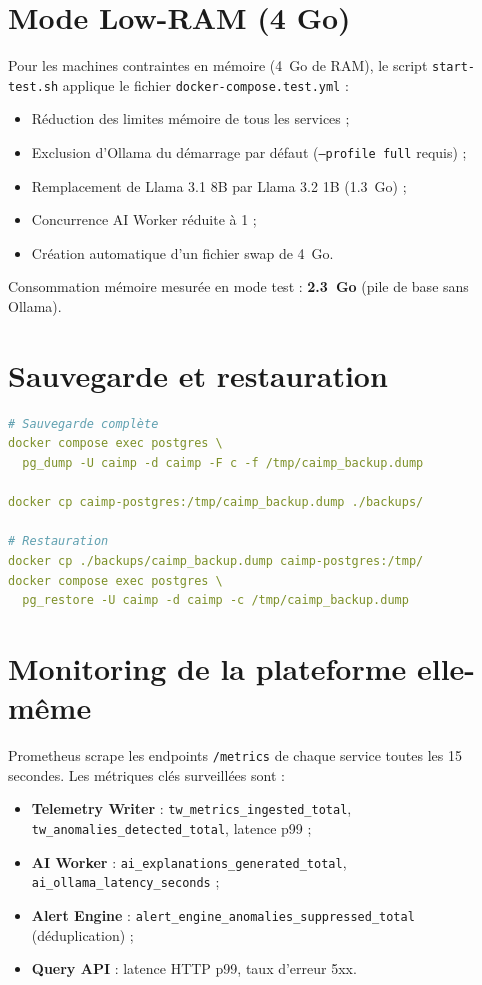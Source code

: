 \section{Mode Low-RAM (4 Go)}

Pour les machines contraintes en mémoire (4~Go de RAM), le script
\texttt{start-test.sh} applique le fichier \texttt{docker-compose.test.yml} :

\begin{itemize}
  \item Réduction des limites mémoire de tous les services ;
  \item Exclusion d'Ollama du démarrage par défaut
    (\texttt{--profile full} requis) ;
  \item Remplacement de Llama 3.1 8B par Llama 3.2 1B (1.3~Go) ;
  \item Concurrence AI Worker réduite à 1 ;
  \item Création automatique d'un fichier swap de 4~Go.
\end{itemize}

Consommation mémoire mesurée en mode test : \textbf{2.3~Go} (pile de base sans Ollama).

\section{Sauvegarde et restauration}

\begin{lstlisting}[language=YAML, caption={Procédure de sauvegarde PostgreSQL}]
# Sauvegarde complète
docker compose exec postgres \
  pg_dump -U caimp -d caimp -F c -f /tmp/caimp_backup.dump

docker cp caimp-postgres:/tmp/caimp_backup.dump ./backups/

# Restauration
docker cp ./backups/caimp_backup.dump caimp-postgres:/tmp/
docker compose exec postgres \
  pg_restore -U caimp -d caimp -c /tmp/caimp_backup.dump
\end{lstlisting}

\section{Monitoring de la plateforme elle-même}

Prometheus scrape les endpoints \texttt{/metrics} de chaque service toutes les
15 secondes. Les métriques clés surveillées sont :

\begin{itemize}
  \item \textbf{Telemetry Writer} : \texttt{tw\_metrics\_ingested\_total},
    \texttt{tw\_anomalies\_detected\_total}, latence p99 ;
  \item \textbf{AI Worker} : \texttt{ai\_explanations\_generated\_total},
    \texttt{ai\_ollama\_latency\_seconds} ;
  \item \textbf{Alert Engine} : \texttt{alert\_engine\_anomalies\_suppressed\_total}
    (déduplication) ;
  \item \textbf{Query API} : latence HTTP p99, taux d'erreur 5xx.
\end{itemize}


